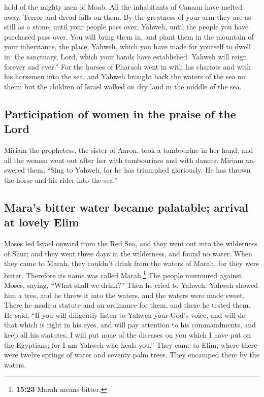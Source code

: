 \begin{paracol}{2}
\begin{otherlanguage}{english}
hold of the mighty men of Moab. All the inhabitants of Canaan have
melted away.  Terror and dread falls on them. By the
greatness of your arm they are as still as a stone, until your people
pass over, Yahweh, until the people you have purchased pass over.
 You will bring them in, and plant them in the mountain
of your inheritance, the place, Yahweh, which you have made for yourself
to dwell in: the sanctuary, Lord, which your hands have established.
 Yahweh will reign forever and ever.'' 
For the horses of Pharaoh went in with his chariots and with his
horsemen into the sea, and Yahweh brought back the waters of the sea on
them; but the children of Israel walked on dry land in the middle of the
sea.

\hypertarget{participation-of-women-in-the-praise-of-the-lord}{%
\subsection{Participation of women in the praise of the
Lord}\label{participation-of-women-in-the-praise-of-the-lord}}

 Miriam the prophetess, the sister of Aaron, took a
tambourine in her hand; and all the women went out after her with
tambourines and with dances.  Miriam answered them,
``Sing to Yahweh, for he has triumphed gloriously. He has thrown the
horse and his rider into the sea.''

\hypertarget{maras-bitter-water-became-palatable-arrival-at-lovely-elim}{%
\subsection{Mara's bitter water became palatable; arrival at lovely
Elim}\label{maras-bitter-water-became-palatable-arrival-at-lovely-elim}}

 Moses led Israel onward from the Red Sea, and they went
out into the wilderness of Shur; and they went three days in the
wilderness, and found no water.  When they came to Marah,
they couldn't drink from the waters of Marah, for they were bitter.
Therefore its name was called Marah.\footnote{\textbf{15:23} Marah means
  bitter.}  The people murmured against Moses, saying,
``What shall we drink?''  Then he cried to Yahweh. Yahweh
showed him a tree, and he threw it into the waters, and the waters were
made sweet. There he made a statute and an ordinance for them, and there
he tested them.  He said, ``If you will diligently listen
to Yahweh your God's voice, and will do that which is right in his eyes,
and will pay attention to his commandments, and keep all his statutes, I
will put none of the diseases on you which I have put on the Egyptians;
for I am Yahweh who heals you.''  They came to Elim,
where there were twelve springs of water and seventy palm trees. They
encamped there by the waters.


\end{otherlanguage}
\end{paracol}
